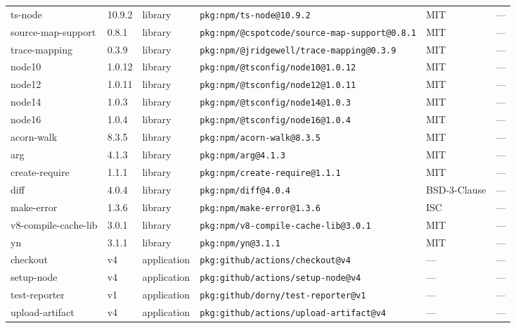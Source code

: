 \documentclass[11pt,a4paper]{article}
\begin{document}
\begin{longtable}{|p{4cm}|p{2cm}|p{1.6cm}|p{5cm}|p{1.5cm}|p{3.5cm}|}
\raggedright ts-node & 10.9.2 & library & \small\texttt{pkg:npm/ts-node@10.9.2} & MIT & \small — \\
\raggedright source-map-support & 0.8.1 & library & \small\texttt{pkg:npm/@cspotcode/source-map-support@0.8.1} & MIT & \small — \\
\raggedright trace-mapping & 0.3.9 & library & \small\texttt{pkg:npm/@jridgewell/trace-mapping@0.3.9} & MIT & \small — \\
\raggedright node10 & 1.0.12 & library & \small\texttt{pkg:npm/@tsconfig/node10@1.0.12} & MIT & \small — \\
\raggedright node12 & 1.0.11 & library & \small\texttt{pkg:npm/@tsconfig/node12@1.0.11} & MIT & \small — \\
\raggedright node14 & 1.0.3 & library & \small\texttt{pkg:npm/@tsconfig/node14@1.0.3} & MIT & \small — \\
\raggedright node16 & 1.0.4 & library & \small\texttt{pkg:npm/@tsconfig/node16@1.0.4} & MIT & \small — \\
\raggedright acorn-walk & 8.3.5 & library & \small\texttt{pkg:npm/acorn-walk@8.3.5} & MIT & \small — \\
\raggedright arg & 4.1.3 & library & \small\texttt{pkg:npm/arg@4.1.3} & MIT & \small — \\
\raggedright create-require & 1.1.1 & library & \small\texttt{pkg:npm/create-require@1.1.1} & MIT & \small — \\
\raggedright diff & 4.0.4 & library & \small\texttt{pkg:npm/diff@4.0.4} & BSD-3-Clause & \small — \\
\raggedright make-error & 1.3.6 & library & \small\texttt{pkg:npm/make-error@1.3.6} & ISC & \small — \\
\raggedright v8-compile-cache-lib & 3.0.1 & library & \small\texttt{pkg:npm/v8-compile-cache-lib@3.0.1} & MIT & \small — \\
\raggedright yn & 3.1.1 & library & \small\texttt{pkg:npm/yn@3.1.1} & MIT & \small — \\
\raggedright checkout & v4 & application & \small\texttt{pkg:github/actions/checkout@v4} & — & \small — \\
\raggedright setup-node & v4 & application & \small\texttt{pkg:github/actions/setup-node@v4} & — & \small — \\
\raggedright test-reporter & v1 & application & \small\texttt{pkg:github/dorny/test-reporter@v1} & — & \small — \\
\raggedright upload-artifact & v4 & application & \small\texttt{pkg:github/actions/upload-artifact@v4} & — & \small — \\
\end{longtable}
\end{document}
